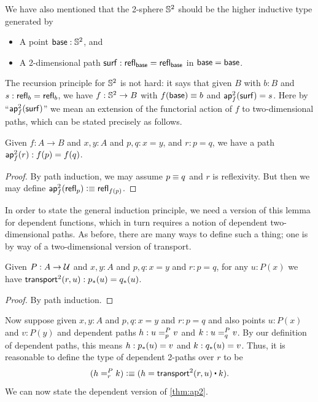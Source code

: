 %

%
%
We have also mentioned that the 2-sphere $\Sn^2$ should be the higher inductive type generated by
\begin{itemize}
\item A point $\base:\Sn^2$, and
\item A 2-dimensional path $\surf:\refl{\base} = \refl{\base}$ in ${\base=\base}$.
\end{itemize}
%
The recursion principle for $\Sn^2$ is not hard: it says that given $B$ with $b:B$ and $s:\refl b = \refl b$, we have $f:\Sn^2\to B$ with $f(\base)\jdeq b$ and $\aptwo f \surf = s$.
Here by ``$\aptwo f \surf$'' we mean an extension of the functorial action of $f$ to two-dimensional paths, which can be stated precisely as follows.

\begin{lem}\label{thm:ap2}
  Given $f:A\to B$ and $x,y:A$ and $p,q:x=y$, and $r:p=q$, we have a path $\aptwo f r : \ap f p = \ap f q$.
\end{lem}
\begin{proof}
  By path induction, we may assume $p\jdeq q$ and $r$ is reflexivity.
  But then we may define $\aptwo f {\refl p} \defeq \refl{\ap f p}$.
\end{proof}

In order to state the general induction principle, we need a version of this lemma for dependent functions, which in turn requires a notion of dependent two-dimensional paths.
As before, there are many ways to define such a thing; one is by way of a two-dimensional version of transport.

\begin{lem}\label{thm:transport2}
  Given $P:A\to\type$ and $x,y:A$ and $p,q:x=y$ and $r:p=q$, for any $u:P(x)$ we have $\transtwo r u : \trans p u = \trans q u$.
\end{lem}
\begin{proof}
  By path induction.
\end{proof}

Now suppose given $x,y:A$ and $p,q:x=y$ and $r:p=q$ and also points $u:P(x)$ and $v:P(y)$ and dependent paths $h:\dpath P p u v$ and $k:\dpath P q u v$.
By our definition of dependent paths, this means $h:\trans p u = v$ and $k:\trans q u = v$.
Thus, it is reasonable to define the type of dependent 2-paths over $r$ to be
\[ (\dpath P r h k )\defeq (h = \transtwo r u \ct k). \]
We can now state the dependent version of \cref{thm:ap2}.

